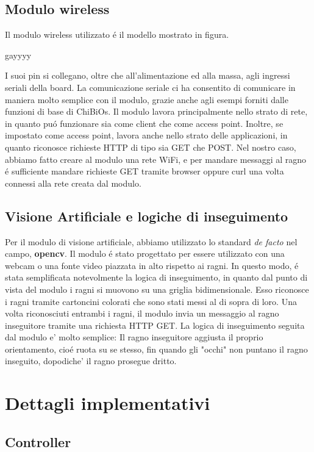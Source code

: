 \documentclass [11pt ,a4paper ,twoside ]{article}
\begin{document}
\subsection{Modulo wireless}
Il modulo wireless utilizzato \'e il modello  mostrato in figura. 
\begin{center}
gayyyy
\end{center}
I suoi pin si collegano, oltre che all'alimentazione ed alla massa, agli ingressi seriali della board. La comunicazione seriale ci ha consentito di comunicare in maniera molto semplice con il modulo, grazie anche agli esempi forniti dalle funzioni di base di ChiBiOs. Il modulo lavora principalmente nello strato di rete, in quanto pu\'o funzionare sia come client che come access point. Inoltre, se impostato come access point, lavora anche nello strato delle applicazioni, in quanto riconosce richieste HTTP di tipo sia GET che POST. Nel nostro caso, abbiamo fatto creare al modulo una rete WiFi, e per mandare messaggi al ragno \'e sufficiente mandare richieste GET tramite browser oppure curl una volta connessi alla rete creata dal modulo.

\subsection{Visione Artificiale e logiche di inseguimento}
Per il modulo di visione artificiale, abbiamo utilizzato lo standard \textit{de facto} nel campo, \textbf{opencv}. Il modulo \'e stato progettato per essere utilizzato con una webcam o una fonte video piazzata in alto rispetto ai ragni. In questo modo, \'e stata semplificata notevolmente la logica di inseguimento, in quanto dal punto di vista del modulo i ragni si muovono su una griglia bidimensionale. Esso riconosce i ragni tramite cartoncini colorati che sono stati messi al di sopra di loro. Una volta riconosciuti entrambi i ragni, il modulo invia un messaggio al ragno inseguitore tramite una richiesta HTTP GET. La logica di inseguimento seguita dal modulo e' molto semplice: Il ragno inseguitore aggiusta il proprio orientamento, cio\'e ruota su se stesso, fin quando gli "occhi" non puntano il ragno inseguito, dopodiche' il ragno prosegue dritto.

\section{Dettagli implementativi}

\subsection{Controller}
\end{document}
